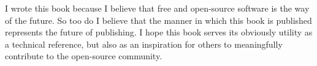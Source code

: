 I wrote this book because I believe that free and open-source software is the
way of the future. So too do I believe that the manner in which this book is
published represents the future of publishing. I hope this book serves its
obviously utility as a technical reference, but also as an inspiration for
others to meaningfully contribute to the open-source community.

